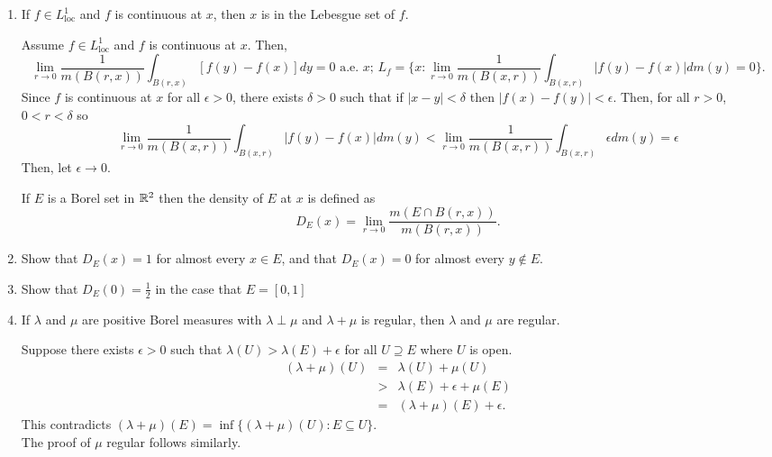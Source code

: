 \begin{enumerate}
\item If $f \in L^1_{\text{loc}}$ and $f$ is continuous at $x$, then $x$ is in the Lebesgue set of $f$.	\\
\begin{pf}
	Assume $f \in L^1_{\text{loc}}$ and $f$ is continuous at $x$. Then,
	$$
	\lim_{r \rightarrow 0} \frac{1}{m(B(r,x))} \int_{B(r,x)}[f(y) - f(x)] dy = 0 \text{ a.e. } x
	 \text{; }
	L_f = \{ x: \lim_{r \rightarrow 0} \frac{1}{m(B(x,r))} \int_{B(x,r)} |f(y) - f(x)| dm(y) = 0 \}.
	$$
	Since $f$ is continuous at $x$ for all $\epsilon >0$, there exists $\delta>0$ such that if $|x-y|< \delta$ then $|f(x) - f(y)|< \epsilon$. Then, for all $r>0$, $0 < r < \delta$ so \[
	\lim_{r \rightarrow 0} \frac{1}{m(B(x,r))} \int_{B(x,r)}|f(y) - f(x)| dm(y) < \lim_{r \rightarrow 0} \frac{1}{m(B(x,r))} \int_{B(x,r)} \epsilon dm(y) = \epsilon
	\] 
	Then, let $\epsilon \rightarrow 0 $. 
\end{pf}

If $E$ is a Borel set in ${\mathbb R}^2$ then the density of $E$ at $x$ is defined as \[
D_E(x) = \lim_{r \rightarrow 0} \frac{m(E \cap B(r,x))}{m(B(r,x))}. 
\]
\item Show that $D_E(x)=1$ for almost every $x \in E$, and that $D_E(x) = 0$ for almost every $y \not\in E$.
\item Show that $D_E(0) = \frac{1}{2}$ in the case that $E=[0,1]$
\item If $\lambda$ and $\mu$ are positive Borel measures with $\lambda \perp \mu$ and $\lambda + \mu$ is regular, then $\lambda$ and $\mu$ are regular.
 \begin{pf} Suppose there exists $\epsilon>0$ such that $\lambda(U) > \lambda(E) + \epsilon$ for all $U \supseteq E$ where $U$ is open.
 \begin{eqnarray*}
 (\lambda + \mu)(U) & = & \lambda(U) + \mu(U) \\
 & > & \lambda(E) + \epsilon + \mu(E) \\
 & = & (\lambda + \mu)(E) + \epsilon.	
 \end{eqnarray*}
This contradicts $(\lambda+ \mu)(E) = \inf \{ (\lambda+ \mu)(U) : E \subseteq U \}$. \\
The proof of $\mu$ regular follows similarly. 
 
 	
 \end{pf}

\end{enumerate}